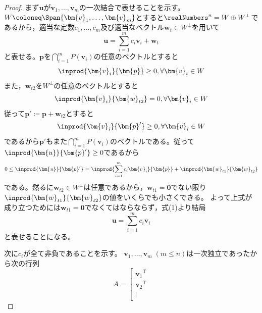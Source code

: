             \begin{proof}
                \quad\par
                    まず$\bm{u}$が$\bm{v}_1,\dotsc,\bm{v}_m$の一次結合で表せることを示す。\\
                    $W \coloneq \Span{\bm{v}_1,\dotsc,\bm{v}_m}$とすると$\realNumbers^n = W\oplus W^\bot$であるから，適当な定数$c_1,\dotsc,c_m$及び適当なベクトル$\bm{w}_t\in W^\bot$を用いて
                    \begin{equation}
                        \bm{u} = \sum_{i=1}^{m}{c_i\bm{v}_i} + \bm{w}_t
                    \end{equation}
                    と表せる。$\bm{p}$を$\bigcap_{i=1}^{m}{P(\bm{v}_i)}$の任意のベクトルとすると
                    \[\inprod{\bm{v}_i}{\bm{p}}\geq0,\forall\bm{v}_i\in W\]
                    また，$\bm{w}_{t2}$を$W^\bot$の任意のベクトルとすると
                    \[\inprod{\bm{v}_i}{\bm{w}_{t2}}=0,\forall\bm{v}_i\in W\]
                    従って$\bm{p}' \coloneq \bm{p}+\bm{w}_{t2}$とすると
                    \[\inprod{\bm{v}_i}{\bm{p}'}\geq0,\forall\bm{v}_i\in W\]
                    であるから$\bm{p'}$もまた$\bigcap_{i=1}^{m}{P(\bm{v}_i)}$のベクトルである。従って$\inprod{\bm{u}}{\bm{p}'}\geq0$であるから
                    \[0\leq\inprod{\bm{u}}{\bm{p}'} = \inprod{\sum_{i=1}^{m}{c_i\bm{v}_i}}{\bm{p}} + \inprod{\bm{w}_{t1}}{\bm{w}_{t2}}\]
                    である。然るに$\bm{w}_{t2}\in W^\bot$は任意であるから，$\bm{w}_{t1}=\bm{0}$でない限り$\inprod{\bm{w}_{t1}}{\bm{w}_{t2}}$の値をいくらでも小さくできる。
                    よって上式が成り立つためには$\bm{w}_{t1}=\bm{0}$でなくてはならならず，式(1)より結局
                    \[\bm{u} = \sum_{i=1}^{m}{c_i\bm{v}_i}\]
                    と表せることになる。
                    \par
                    次に$c_i$が全て非負であることを示す。%
                    $\bm{v}_1,\dotsc,\bm{v}_m\;(m\leq n)$は一次独立であったから次の行列
                    \[
                        A = \left[
                            \begin{array}{c}
                                {\bm{v}_1}^\textrm{T}\\
                                {\bm{v}_2}^\textrm{T}\\
                                \vdots\\

\end{array}\]
\end{proof}
